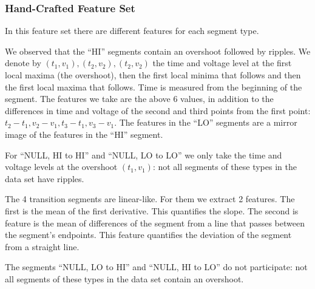 \documentclass[conference]{IEEEtran}
\begin{document}
\subsubsection{Hand-Crafted Feature Set}

  In this feature set there are different features for each segment type.
  
  We observed that the ``HI'' segments contain an overshoot followed by ripples. We denote by \((t_1, v_1), (t_2, v_2), (t_2, v_2)\) the time and voltage level at the first local maxima (the overshoot), then the first local minima that follows and then the first local maxima that follows. Time is measured from the beginning of the segment. The features we take are the above 6 values, in addition to the differences in time and voltage of the second and third points from the first point: \(t_2-t_1, v_2-v_1, t_3-t_1, v_3-v_1\). The features in the ``LO'' segments are a mirror image of the features in the ``HI'' segment.
  
  For ``NULL, HI to HI'' and ``NULL, LO to LO'' we only take the time and voltage levels at the overshoot \((t_1, v_1)\): not all segments of these types in the data set have ripples.
  
  The 4 transition segments are linear-like. For them we extract 2 features. The first is the mean of the first derivative. This quantifies the slope. The second is feature is the mean of differences of the segment from a line that passes between the segment's endpoints. This feature quantifies the deviation of the segment from a straight line.
  
  The segments ``NULL, LO to HI'' and ``NULL, HI to LO'' do not participate: not all segments of these types in the data set contain an overshoot.
  
  \begin{table}
    \caption{Number of Features per Segment Type}
    \label{tab:feature_set_sizes}
    \centering
  \end{table}
  
\end{document}
